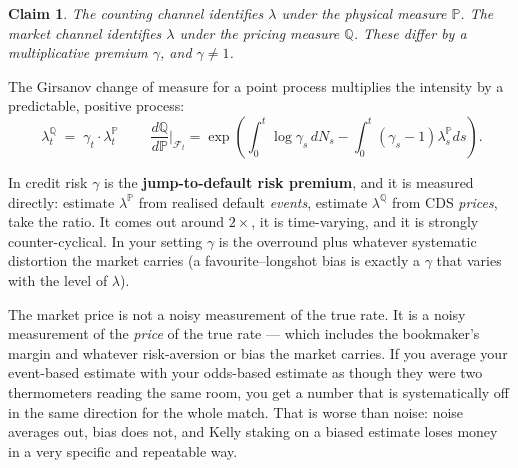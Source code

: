 \documentclass[11pt,a4paper]{article}
\theoremstyle{plain}
\newtheorem{claim}{Claim}
\begin{document}
\begin{claim}
The counting channel identifies $\lambda$ under the physical measure $\mathbb{P}$. The market
channel identifies $\lambda$ under the pricing measure $\mathbb{Q}$. These differ by a
multiplicative premium $\gamma$, and $\gamma\ne1$.
\end{claim}

The Girsanov change of measure for a point process multiplies the intensity by a predictable,
positive process:
\begin{equation}
\boxed{\;\lambda^{\mathbb{Q}}_t \;=\; \gamma_t\cdot\lambda^{\mathbb{P}}_t\;}
\qquad
\frac{d\mathbb{Q}}{d\mathbb{P}}\bigg|_{\mathcal{F}_t}
= \exp\!\left(\int_0^t\!\log\gamma_s\,dN_s - \int_0^t\!(\gamma_s-1)\lambda^{\mathbb{P}}_s ds\right).
\label{eq:girsanov}
\end{equation}

In credit risk $\gamma$ is the \textbf{jump-to-default risk premium}, and it is measured
directly: estimate $\lambda^{\mathbb{P}}$ from realised default \emph{events}, estimate
$\lambda^{\mathbb{Q}}$ from CDS \emph{prices}, take the ratio. It comes out around $2\times$,
it is time-varying, and it is strongly counter-cyclical. In your setting $\gamma$ is the
overround plus whatever systematic distortion the market carries (a favourite--longshot bias
is exactly a $\gamma$ that varies with the level of $\lambda$).

\begin{plain}
The market price is not a noisy measurement of the true rate. It is a noisy measurement of the
\emph{price} of the true rate --- which includes the bookmaker's margin and whatever
risk-aversion or bias the market carries. If you average your event-based estimate with your
odds-based estimate as though they were two thermometers reading the same room, you get a
number that is systematically off in the same direction for the whole match. That is worse
than noise: noise averages out, bias does not, and Kelly staking on a biased estimate loses
money in a very specific and repeatable way.
\end{plain}
\end{document}
